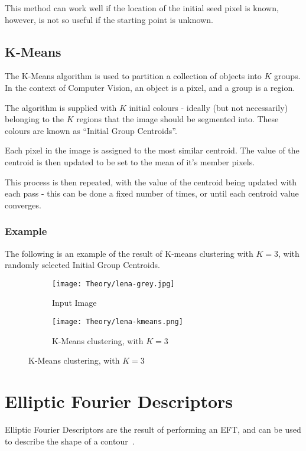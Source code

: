 This method can work well if the location of the initial seed pixel is known, however, is not so useful if the starting point is unknown.

\subsection{K-Means}
\label{sec:kmeans}
The K-Means algorithm is used to partition a collection of objects into $K$ groups. In the context of Computer Vision, an object is a pixel, and a group is a region.

The algorithm is supplied with $K$ initial colours - ideally (but not necessarily) belonging to the $K$ regions that the image should be segmented into. These colours are known as ``Initial Group Centroids''.

Each pixel in the image is assigned to the most similar centroid. The value of the centroid is then updated to be set to the mean of it's member pixels.

This process is then repeated, with the value of the centroid being updated with each pass - this can be done a fixed number of times, or until each centroid value converges.

\subsubsection{Example}
The following is an example of the result of K-means clustering with $K = 3$, with randomly selected Initial Group Centroids.

\begin{figure}[H]
    \centering
    \begin{subfigure}[b]{0.45\textwidth}
        \centering
        \texttt{[image: Theory/lena-grey.jpg]}
        \caption{Input Image}
    \end{subfigure}
    \begin{subfigure}[b]{0.45\textwidth}
        \centering
        \texttt{[image: Theory/lena-kmeans.png]}
        \caption{K-Means clustering, with $K = 3$}
    \end{subfigure}
\end{figure}

\section{Elliptic Fourier Descriptors}
Elliptic Fourier Descriptors are the result of performing an \ac{EFT}, and can be used to describe the shape of a contour~\cite{kuhl1982elliptic}.

